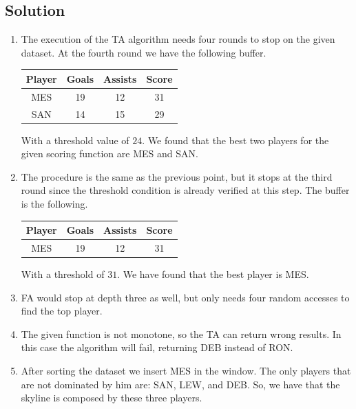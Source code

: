 \documentclass[12pt, a4paper]{report}
\begin{document}
    \subsection*{Solution}
        \begin{enumerate}
            \item The execution of the TA algorithm needs four rounds to stop on the given dataset. At the fourth 
                round we have the following buffer. 
                \begin{table}[H]
                    \centering
                    \begin{tabular}{c|cc|c}
                    \hline
                    \textbf{Player} & \textbf{Goals} & \textbf{Assists} & \textbf{Score} \\ \hline
                    MES             & 19             & 12               & 31             \\
                    SAN             & 14             & 15               & 29             \\ \hline
                    \end{tabular}
                \end{table}
                With a threshold value of $24$. We found that the best two players for the given scoring function
                are MES and SAN. 
            \item The procedure is the same as the previous point, but it stops at the third round since the threshold 
                condition is already verified at this step. The buffer is the following.
                \begin{table}[H]
                    \centering
                    \begin{tabular}{c|cc|c}
                    \hline
                    \textbf{Player} & \textbf{Goals} & \textbf{Assists} & \textbf{Score} \\ \hline
                    MES             & 19             & 12               & 31             \\ \hline
                    \end{tabular}
                \end{table}
                With a threshold of $31$. We have found that the best player is MES. 
            \item FA would stop at depth three as well, but only needs four random accesses to find the top player. 
            \item The given function is not monotone, so the TA can return wrong results. In this case the algorithm 
                will fail, returning DEB instead of RON. 
            \item After sorting the dataset we insert MES in the window. The only players that are not dominated by him
                are: SAN, LEW, and DEB. So, we have that the skyline is composed by these three players. 
        \end{enumerate}
\end{document}
